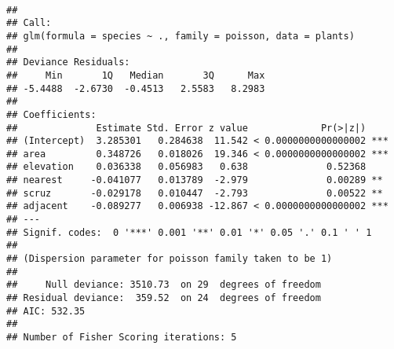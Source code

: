 \documentclass[]{article}
\newenvironment{Shaded}{\begin{snugshade}}{\end{snugshade}}
\newcommand{\KeywordTok}[1]{\textcolor[rgb]{0.13,0.29,0.53}{\textbf{#1}}}
\newcommand{\DataTypeTok}[1]{\textcolor[rgb]{0.13,0.29,0.53}{#1}}
\newcommand{\DecValTok}[1]{\textcolor[rgb]{0.00,0.00,0.81}{#1}}
\newcommand{\CharTok}[1]{\textcolor[rgb]{0.31,0.60,0.02}{#1}}
\newcommand{\StringTok}[1]{\textcolor[rgb]{0.31,0.60,0.02}{#1}}
\newcommand{\OperatorTok}[1]{\textcolor[rgb]{0.81,0.36,0.00}{\textbf{#1}}}
\newcommand{\NormalTok}[1]{#1}
\begin{document}
~

\begin{Shaded}
\end{Shaded}

\begin{verbatim}
## 
## Call:
## glm(formula = species ~ ., family = poisson, data = plants)
## 
## Deviance Residuals: 
##     Min       1Q   Median       3Q      Max  
## -5.4488  -2.6730  -0.4513   2.5583   8.2983  
## 
## Coefficients:
##              Estimate Std. Error z value             Pr(>|z|)    
## (Intercept)  3.285301   0.284638  11.542 < 0.0000000000000002 ***
## area         0.348726   0.018026  19.346 < 0.0000000000000002 ***
## elevation    0.036338   0.056983   0.638              0.52368    
## nearest     -0.041077   0.013789  -2.979              0.00289 ** 
## scruz       -0.029178   0.010447  -2.793              0.00522 ** 
## adjacent    -0.089277   0.006938 -12.867 < 0.0000000000000002 ***
## ---
## Signif. codes:  0 '***' 0.001 '**' 0.01 '*' 0.05 '.' 0.1 ' ' 1
## 
## (Dispersion parameter for poisson family taken to be 1)
## 
##     Null deviance: 3510.73  on 29  degrees of freedom
## Residual deviance:  359.52  on 24  degrees of freedom
## AIC: 532.35
## 
## Number of Fisher Scoring iterations: 5
\end{verbatim}
\end{document}
